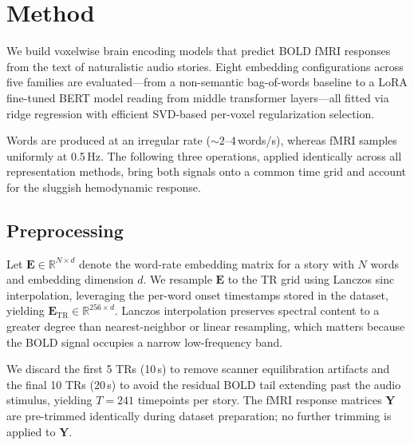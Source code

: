 \graphicspath{{../results/figures/regression_analysis/}}
\maketitle


\section{Method}


We build voxelwise brain encoding models that predict BOLD fMRI responses from
the text of naturalistic audio stories.  Eight embedding configurations across
five families are evaluated---from a non-semantic bag-of-words baseline to a
LoRA fine-tuned BERT model reading from middle transformer layers---all fitted
via ridge regression with efficient SVD-based per-voxel regularization selection.



Words are produced at an irregular rate (${\sim}2$--4\,words/s), whereas fMRI
samples uniformly at 0.5\,Hz.  The following three operations, applied
identically across all representation methods, bring both signals onto a common
time grid and account for the sluggish hemodynamic response.


\subsection{Preprocessing}
Let $\bm{E} \in \mathbb{R}^{N \times d}$ denote the word-rate embedding matrix
for a story with $N$ words and embedding dimension $d$.  We resample $\bm{E}$ to
the TR grid using Lanczos sinc interpolation, leveraging the per-word onset
timestamps stored in the dataset, yielding
$\bm{E}_{\mathrm{TR}} \in \mathbb{R}^{256 \times d}$.  Lanczos interpolation
preserves spectral content to a greater degree than nearest-neighbor or linear
resampling, which matters because the BOLD signal occupies a narrow low-frequency
band.



We discard the first 5 TRs (10\,s) to remove scanner equilibration artifacts and
the final 10 TRs (20\,s) to avoid the residual BOLD tail extending past the audio
stimulus, yielding $T = 241$ timepoints per story.  The fMRI response matrices
$\bm{Y}$ are pre-trimmed identically during dataset preparation; no further
trimming is applied to $\bm{Y}$.



